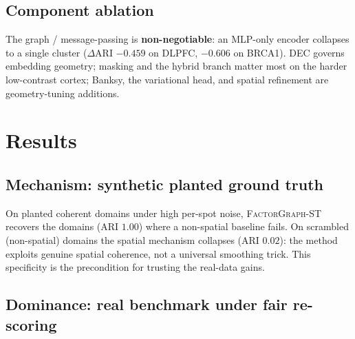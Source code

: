\documentclass[10pt,letterpaper]{article}
\begin{document}
\subsection{Component ablation}
\label{sec:ablation}

The graph / message-passing is \textbf{non-negotiable}: an MLP-only encoder collapses to a
single cluster ($\Delta$ARI $-0.459$ on DLPFC, $-0.606$ on BRCA1). DEC governs embedding
geometry; masking and the hybrid branch matter most on the harder low-contrast cortex;
Banksy, the variational head, and spatial refinement are geometry-tuning additions.

\section{Results}
\label{sec:results}

\subsection{Mechanism: synthetic planted ground truth}
\label{sec:synth}

On planted coherent domains under high per-spot noise, \textsc{FactorGraph-ST} recovers
the domains (ARI $1.00$) where a non-spatial baseline fails. On scrambled (non-spatial)
domains the spatial mechanism collapses (ARI $0.02$): the method exploits genuine spatial
coherence, not a universal smoothing trick. This specificity is the precondition for
trusting the real-data gains.

\subsection{Dominance: real benchmark under fair re-scoring}
\label{sec:benchmark}
\end{document}
